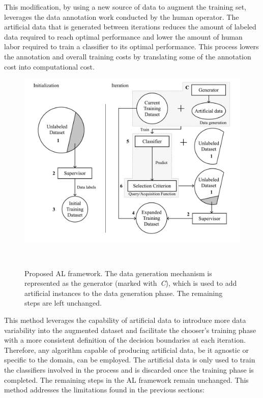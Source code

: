 \documentclass[remotesensing,article,submit,moreauthors,pdftex]{Definitions/mdpi}
\begin{document}
This modification, by using a new source of data to augment the training set,
leverages the data annotation work conducted by the human operator. The
artificial data that is generated between iterations reduces the amount of
labeled data required to reach optimal performance and lower the amount of
human labor required to train a classifier to its optimal performance. This
process lowers the annotation and overall training costs by translating some
of the annotation cost into computational cost.

\begin{figure}[htb]
	\centering
	\includegraphics[width=\linewidth]{../analysis/al_new}
    \caption{Proposed AL framework. The data generation mechanism is
        represented as the generator (marked with~\textit{C}), which is used to add artificial
        instances to the data generation phase. The remaining steps are left
        unchanged.
    }~\label{fig:al_new}
\end{figure}

This method leverages the capability of artificial data to introduce more data
variability into the augmented dataset and facilitate the chooser's training
phase with a more consistent definition of the decision boundaries at each
iteration. Therefore, any algorithm capable of producing artificial data, be
it agnostic or specific to the domain, can be employed. The artificial data is
only used to train the classifiers involved in the process and is discarded
once the training phase is completed. The remaining steps in the AL framework
remain unchanged. This method addresses the limitations found in the previous
sections:
\end{document}

